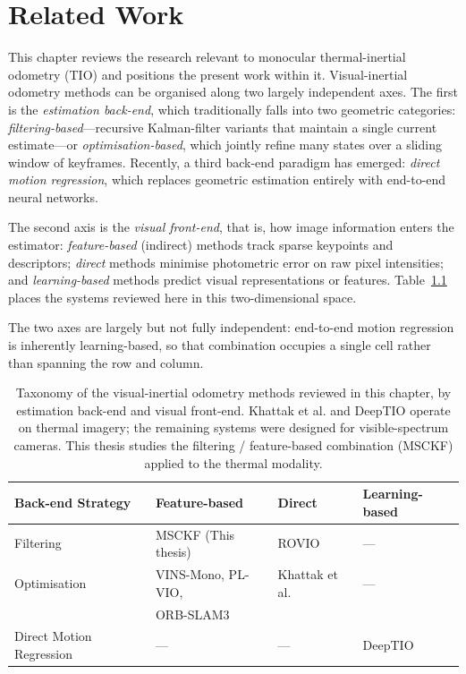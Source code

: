 \chapter{Related Work}
\label{ch:related_work}

This chapter reviews the research relevant to monocular thermal-inertial odometry (TIO) and positions the present work within it. Visual-inertial odometry methods can be organised along two largely independent axes. The first is the \emph{estimation back-end}, which traditionally falls into two geometric categories: \emph{filtering-based}---recursive Kalman-filter variants that maintain a single current estimate---or \emph{optimisation-based}, which jointly refine many states over a sliding window of keyframes. Recently, a third back-end paradigm has emerged: \emph{direct motion regression}, which replaces geometric estimation entirely with end-to-end neural networks. 

The second axis is the \emph{visual front-end}, that is, how image information enters the estimator: \emph{feature-based} (indirect) methods track sparse keypoints and descriptors; \emph{direct} methods minimise photometric error on raw pixel intensities; and \emph{learning-based} methods predict visual representations or features. Table~\ref{tab:vio_taxonomy} places the systems reviewed here in this two-dimensional space.

The two axes are largely but not fully independent: end-to-end motion regression is inherently learning-based, so that combination occupies a single cell rather than spanning the row and column.

\begin{table}[h]
\centering
\caption{Taxonomy of the visual-inertial odometry methods reviewed in this
chapter, by estimation back-end and visual front-end. Khattak et al. and
DeepTIO operate on thermal imagery; the remaining systems were designed for
visible-spectrum cameras. This thesis studies the filtering / feature-based
combination (MSCKF) applied to the thermal modality.}
\label{tab:vio_taxonomy}
\begin{tabular}{llll}
\toprule
\textbf{Back-end Strategy} & \textbf{Feature-based} & \textbf{Direct} & \textbf{Learning-based} \\
\midrule
Filtering       & MSCKF (This thesis)      & ROVIO           & --- \\
Optimisation    & VINS-Mono, PL-VIO,      & Khattak et al.  & --- \\
                          & ORB-SLAM3               &                 &     \\
Direct Motion Regression  & ---                    & ---             & DeepTIO \\
\bottomrule
\end{tabular}
\end{table}

